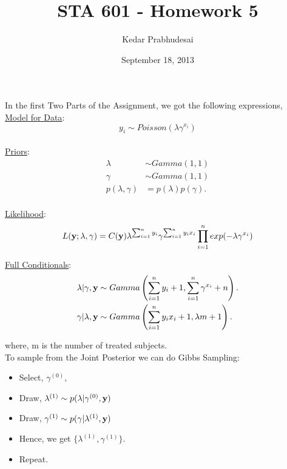 \documentclass{article}
\title{STA 601 - Homework 5}
\author{Kedar Prabhudesai}
\date{September 18, 2013}
\begin{document}
\maketitle

\noindent In the first Two Parts of the Assignment, we got the following expressions,\\

\underline{Model for Data}: $$y_i \sim Poisson(\lambda\gamma^{x_i})$$\\

\underline{Priors}: 
\begin{align*}
\lambda &\sim Gamma(1,1)\\
\gamma &\sim Gamma(1,1)\\
p(\lambda,\gamma) &= p(\lambda)p(\gamma).\\
\end{align*} 

\underline{Likelihood}: 
\begin{align*}
L(\bold{y};\lambda,\gamma) &= C(\bold{y})\lambda^{\sum_{i=1}^{n}y_i}\gamma^{\sum_{i=1}^{n}y_ix_i}\prod_{i=1}^{n}exp(-\lambda\gamma^{x_i} )\\
\end{align*}

\underline{Full Conditionals}:
\begin{align*}
\lambda|\gamma,\bold{y} &\sim Gamma\left(\sum_{i=1}^{n}y_i + 1,\sum_{i=1}^{n}\gamma^{x_i}+n\right).\\
\gamma|\lambda,\bold{y} &\sim Gamma\left(\sum_{i=1}^{n}y_ix_i+1,\lambda m+1\right).\\
\end{align*}

where, m is the number of treated subjects.\\

\noindent To sample from the Joint Posterior we can do Gibbs Sampling:\\
\begin{itemize}
\item Select, $\gamma^{(0)},$
\item Draw, $\lambda^{(1)} \sim p(\lambda|\gamma^{(0)},\bold{y})$
\item Draw, $\gamma^{(1)} \sim p(\gamma|\lambda^{(1)},\bold{y})$
\item Hence, we get $\{\lambda^{(1)},\gamma^{(1)}\}$.
\item Repeat.
\end{itemize}

\pagebreak
\end{document}
